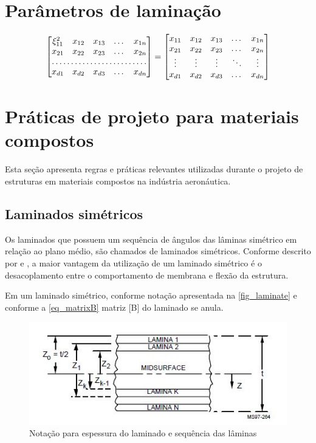 \section{Parâmetros de laminação}


\[
\begin{bmatrix}
    \xi_{11}^2       & x_{12} & x_{13} & \dots & x_{1n} \\
    x_{21}       & x_{22} & x_{23} & \dots & x_{2n} \\
    \hdotsfor{5} \\
    x_{d1}       & x_{d2} & x_{d3} & \dots & x_{dn}
\end{bmatrix}
=
\begin{bmatrix}
    x_{11} & x_{12} & x_{13} & \dots  & x_{1n} \\
    x_{21} & x_{22} & x_{23} & \dots  & x_{2n} \\
    \vdots & \vdots & \vdots & \ddots & \vdots \\
    x_{d1} & x_{d2} & x_{d3} & \dots  & x_{dn}
\end{bmatrix}
\]

\section{Práticas de projeto para materiais compostos}
Esta seção apresenta regras e práticas relevantes utilizadas durante o projeto de estruturas em materiais compostos na indústria aeronáutica.

\subsection{Laminados simétricos}
Os laminados que possuem um sequência	de ângulos das lâminas simétrico em relação ao plano médio, são chamados de laminados simétricos. Conforme descrito por \cite{mil2002handbook} e \cite{niucomposite}, a maior vantagem da utilização de um laminado simétrico é o desacoplamento entre o comportamento de membrana e flexão da estrutura.

Em um laminado simétrico, conforme notação apresentada na \autoref{fig_laminate} e conforme a \autoref{eq_matrixB} matriz [B] do laminado se anula.

\begin{figure}[h]
	\caption{\label{fig_laminate}Notação para espessura do laminado e sequência das lâminas}
  \centering
  \includegraphics[scale=1.0]{figura/Laminate}
\end{figure}

